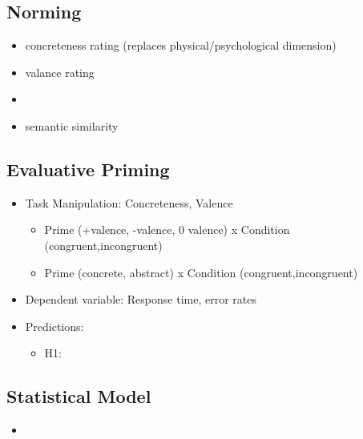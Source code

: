 \documentclass[12pt,letterpaper,table,svgnames,dvipsnames]{article}
\begin{document}
\subsection{Norming}

\begin{itemize}
    \item concreteness rating (replaces physical/psychological dimension)
    \item valance rating
    \item 
    \item semantic similarity 
\end{itemize}


\subsection{Evaluative Priming}


\begin{itemize}[noitemsep]
    \item Task Manipulation: Concreteness, Valence
        \begin{itemize}[noitemsep]
            \item Prime (+valence, -valence, 0 valence) x Condition (congruent,incongruent)
            \item Prime (concrete, abstract) x Condition (congruent,incongruent)
        \end{itemize}
    \item Dependent variable: Response time, error rates
    \item Predictions:
        \begin{itemize}[noitemsep]
            \item H1: 
        \end{itemize}
\end{itemize}


\subsection{Statistical Model}


\begin{itemize}
    \item 
\end{itemize}



\newpage
\end{document}
